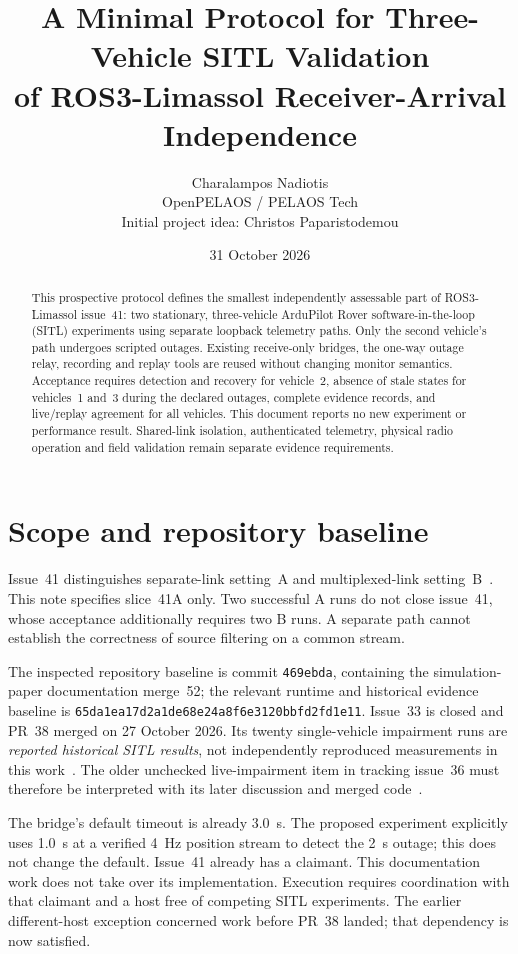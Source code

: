 \documentclass[10pt,a4paper]{article}
\title{A Minimal Protocol for Three-Vehicle SITL Validation\\of ROS3-Limassol Receiver-Arrival Independence}
\author{Charalampos Nadiotis\\OpenPELAOS / PELAOS Tech\\
\small Initial project idea: Christos Paparistodemou}
\date{31 October 2026}
\begin{document}
\maketitle
\vspace{-20pt}
\begin{abstract}
This prospective protocol defines the smallest independently assessable part
of ROS3-Limassol issue~41: two stationary, three-vehicle ArduPilot Rover
software-in-the-loop (SITL) experiments using separate loopback telemetry
paths. Only the second vehicle's path undergoes scripted outages. Existing
receive-only bridges, the one-way outage relay, recording and replay tools
are reused without changing monitor semantics. Acceptance requires detection
and recovery for vehicle~2, absence of stale states for vehicles~1 and~3
during the declared outages, complete evidence records, and live/replay
agreement for all vehicles. This document reports no new experiment or
performance result. Shared-link isolation, authenticated telemetry, physical
radio operation and field validation remain separate evidence requirements.
\end{abstract}

\section{Scope and repository baseline}
Issue~41 distinguishes separate-link setting~A and multiplexed-link
setting~B~\cite{issue41}. This note specifies slice~41A only. Two successful
A runs do not close issue~41, whose acceptance additionally requires two
B runs. A separate path cannot establish the correctness of source filtering
on a common stream.

The inspected repository baseline is commit
\texttt{469ebda}, containing the simulation-paper documentation merge~52;
the relevant runtime and historical evidence baseline is
\texttt{65da1ea17d2a1de68e24a8f6e3120bbfd2fd1e11}.
Issue~33 is closed and PR~38 merged on 27 October 2026. Its twenty
single-vehicle impairment runs are \emph{reported historical SITL results},
not independently reproduced measurements in this work~\cite{pr38,validation}.
The older unchecked live-impairment item in tracking issue~36 must therefore
be interpreted with its later discussion and merged code~\cite{issue36}.

The bridge's default timeout is already 3.0~s. The proposed experiment
explicitly uses 1.0~s at a verified 4~Hz position stream to detect the 2~s
outage; this does not change the default. Issue~41 already has a claimant.
This documentation work does not take over its implementation. Execution
requires coordination with that claimant and a host free of competing SITL
experiments. The earlier different-host exception concerned work before
PR~38 landed; that dependency is now satisfied.
\end{document}
